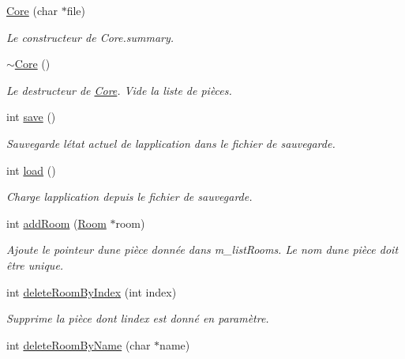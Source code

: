 \begin{DoxyCompactItemize}
\item 
\hyperlink{class_e_p_1_1_core_acfb517a0b01ff278283e940b184fcea4}{Core} (char $\ast$file)
\begin{DoxyCompactList}\small\item\em Le constructeur de Core.\+summary. \end{DoxyCompactList}\item 
\hyperlink{class_e_p_1_1_core_a8e93bf6b84175f17fdbbce75f052a60a}{$\sim$\+Core} ()
\begin{DoxyCompactList}\small\item\em Le destructeur de \hyperlink{class_e_p_1_1_core}{Core}. Vide la liste de pièces. \end{DoxyCompactList}\item 
int \hyperlink{class_e_p_1_1_core_ab89918ae9811065fb1d7d6ff4521ed29}{save} ()
\begin{DoxyCompactList}\small\item\em Sauvegarde l\textquotesingle{}état actuel de l\textquotesingle{}application dans le fichier de sauvegarde. \end{DoxyCompactList}\item 
int \hyperlink{class_e_p_1_1_core_ad7adeeffabb5c616d24a66bb10955149}{load} ()
\begin{DoxyCompactList}\small\item\em Charge l\textquotesingle{}application depuis le fichier de sauvegarde. \end{DoxyCompactList}\item 
int \hyperlink{class_e_p_1_1_core_a881e587636b0333397101372d7c3f6d9}{add\+Room} (\hyperlink{class_e_p_1_1_room}{Room} $\ast$room)
\begin{DoxyCompactList}\small\item\em Ajoute le pointeur d\textquotesingle{}une pièce donnée dans m\+\_\+list\+Rooms. Le nom d\textquotesingle{}une pièce doit être unique. \end{DoxyCompactList}\item 
int \hyperlink{class_e_p_1_1_core_a64f97c800663db86fc7b3626b4ce7d0f}{delete\+Room\+By\+Index} (int index)
\begin{DoxyCompactList}\small\item\em Supprime la pièce dont l\textquotesingle{}index est donné en paramètre. \end{DoxyCompactList}\item 
int \hyperlink{class_e_p_1_1_core_a2cacc28f799c8bfbb5d9c50202346c55}{delete\+Room\+By\+Name} (char $\ast$name)

\end{DoxyCompactItemize}
